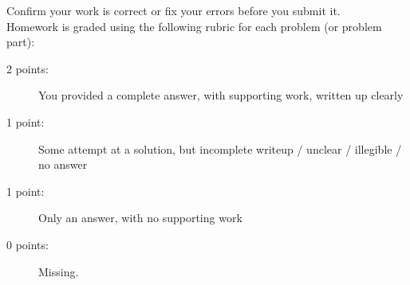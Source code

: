 \documentclass[11pt, oneside]{article}   	%
\begin{document}
Confirm your work is correct or fix your errors before you submit it. \\

Homework is graded using the following rubric for each problem (or problem part):

\begin{description}
\item[2 points:] You provided a complete answer, with supporting work, written up clearly
\item[1 point:] Some attempt at a solution, but incomplete writeup / unclear / illegible / no answer
\item[1 point:] Only an answer, with no supporting work 
\item[0 points:] Missing.
\end{description}
\end{document}
